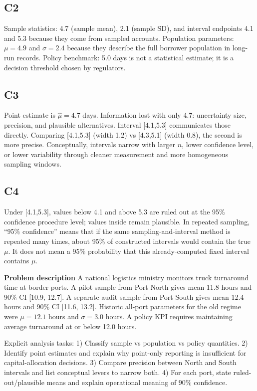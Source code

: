 \begin{ExamProblems}
		\subsection*{C2}
		Sample statistics: 4.7 (sample mean), 2.1 (sample SD), and interval endpoints 4.1 and 5.3 because they come from sampled accounts.
		Population parameters: $\mu=4.9$ and $\sigma=2.4$ because they describe the full borrower population in long-run records.
		Policy benchmark: 5.0 days is not a statistical estimate; it is a decision threshold chosen by regulators.
		
		\subsection*{C3}
		Point estimate is $\hat{\mu}=4.7$ days.
		Information lost with only 4.7: uncertainty size, precision, and plausible alternatives.
		Interval [4.1,5.3] communicates those directly.
		Comparing [4.1,5.3] (width 1.2) vs [4.3,5.1] (width 0.8), the second is more precise.
		Conceptually, intervals narrow with larger $n$, lower confidence level, or lower variability through cleaner measurement and more homogeneous sampling windows.
		
		\subsection*{C4}
		Under [4.1,5.3], values below 4.1 and above 5.3 are ruled out at the 95\% confidence procedure level; values inside remain plausible.
		In repeated sampling, ``95\% confidence'' means that if the same sampling-and-interval method is repeated many times, about 95\% of constructed intervals would contain the true $\mu$.
		It does not mean a 95\% probability that this already-computed fixed interval contains $\mu$.

		\newpage
		\item
		\textbf{Problem description}
		A national logistics ministry monitors truck turnaround time at border ports.
		A pilot sample from Port North gives mean 11.8 hours and 90\% CI [10.9, 12.7].
		A separate audit sample from Port South gives mean 12.4 hours and 90\% CI [11.6, 13.2].
		Historic all-port parameters for the old regime were $\mu=12.1$ hours and $\sigma=3.0$ hours.
		A policy KPI requires maintaining average turnaround at or below 12.0 hours.
		
		Explicit analysis tasks:
		1) Classify sample vs population vs policy quantities.
		2) Identify point estimates and explain why point-only reporting is insufficient for capital-allocation decisions.
		3) Compare precision between North and South intervals and list conceptual levers to narrow both.
		4) For each port, state ruled-out/plausible means and explain operational meaning of 90\% confidence.
		

\end{ExamProblems}
